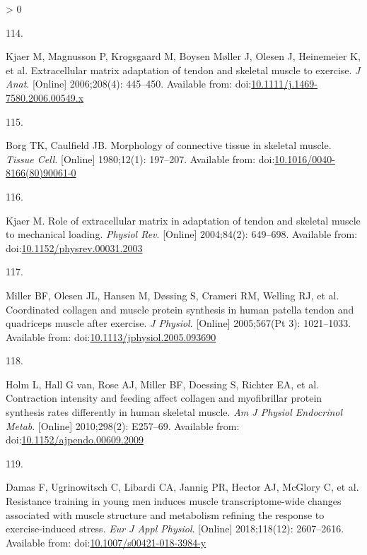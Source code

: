 \documentclass[twoside,10pt]{gihclass} %
\newlength{\cslhangindent}
\newlength{\csllabelwidth}
\newenvironment{CSLReferences}[3] %
 {%
  \setlength{\parindent}{0pt}
  \ifodd #1 \everypar{\setlength{\hangindent}{\cslhangindent}}\ignorespaces\fi
  \ifnum #2 > 0
  \setlength{\parskip}{#2\baselineskip}
  \fi
 }%
 {}
\newcommand{\CSLLeftMargin}[1]{\parbox[t]{\maxof{\widthof{#1}}{\csllabelwidth}}{#1}}
\newcommand{\CSLRightInline}[1]{\parbox[t]{\linewidth}{#1}}
\begin{document}
\begin{CSLReferences}{0}{0}
\leavevmode\hypertarget{ref-RN2770}{}%
\CSLLeftMargin{114. }
\CSLRightInline{Kjaer M, Magnusson P, Krogsgaard M, Boysen Møller J, Olesen J, Heinemeier K, et al. Extracellular matrix adaptation of tendon and skeletal muscle to exercise. \emph{J Anat}. {[}Online{]} 2006;208(4): 445--450. Available from: doi:\href{https://doi.org/10.1111/j.1469-7580.2006.00549.x}{10.1111/j.1469-7580.2006.00549.x}}

\leavevmode\hypertarget{ref-RN2783}{}%
\CSLLeftMargin{115. }
\CSLRightInline{Borg TK, Caulfield JB. Morphology of connective tissue in skeletal muscle. \emph{Tissue Cell}. {[}Online{]} 1980;12(1): 197--207. Available from: doi:\href{https://doi.org/10.1016/0040-8166(80)90061-0}{10.1016/0040-8166(80)90061-0}}

\leavevmode\hypertarget{ref-RN2421}{}%
\CSLLeftMargin{116. }
\CSLRightInline{Kjaer M. Role of extracellular matrix in adaptation of tendon and skeletal muscle to mechanical loading. \emph{Physiol Rev}. {[}Online{]} 2004;84(2): 649--698. Available from: doi:\href{https://doi.org/10.1152/physrev.00031.2003}{10.1152/physrev.00031.2003}}

\leavevmode\hypertarget{ref-RN2788}{}%
\CSLLeftMargin{117. }
\CSLRightInline{Miller BF, Olesen JL, Hansen M, Døssing S, Crameri RM, Welling RJ, et al. Coordinated collagen and muscle protein synthesis in human patella tendon and quadriceps muscle after exercise. \emph{J Physiol}. {[}Online{]} 2005;567(Pt 3): 1021--1033. Available from: doi:\href{https://doi.org/10.1113/jphysiol.2005.093690}{10.1113/jphysiol.2005.093690}}

\leavevmode\hypertarget{ref-RN2454}{}%
\CSLLeftMargin{118. }
\CSLRightInline{Holm L, Hall G van, Rose AJ, Miller BF, Doessing S, Richter EA, et al. Contraction intensity and feeding affect collagen and myofibrillar protein synthesis rates differently in human skeletal muscle. \emph{Am J Physiol Endocrinol Metab}. {[}Online{]} 2010;298(2): E257--69. Available from: doi:\href{https://doi.org/10.1152/ajpendo.00609.2009}{10.1152/ajpendo.00609.2009}}

\leavevmode\hypertarget{ref-RN2298}{}%
\CSLLeftMargin{119. }
\CSLRightInline{Damas F, Ugrinowitsch C, Libardi CA, Jannig PR, Hector AJ, McGlory C, et al. Resistance training in young men induces muscle transcriptome-wide changes associated with muscle structure and metabolism refining the response to exercise-induced stress. \emph{Eur J Appl Physiol}. {[}Online{]} 2018;118(12): 2607--2616. Available from: doi:\href{https://doi.org/10.1007/s00421-018-3984-y}{10.1007/s00421-018-3984-y}}


\end{CSLReferences}
\end{document}
